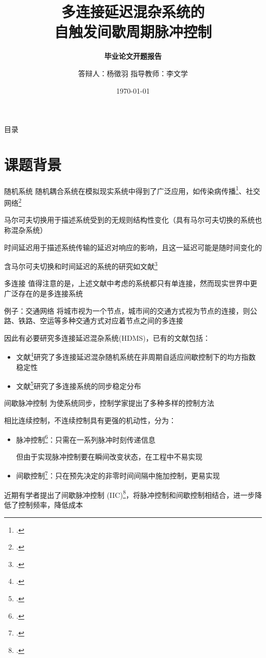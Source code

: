 \documentclass[10pt,aspectratio=43]{beamer}
\title{多连接延迟混杂系统的\\自触发间歇周期脉冲控制}
\subtitle{\fontsize{9pt}{14pt}\textbf{毕业论文开题报告}}
\author{答辩人：杨徵羽 \quad 指导教师：李文学}
\institute{哈尔滨工业大学(威海)理学院}
\date{\today}
\begin{document}
\frame{\titlepage}

\section[目录]{}   %
\begin{frame}{目录}
\tableofcontents
\end{frame}

\section{课题背景}
\begin{frame}{随机系统}
\alert{随机耦合系统}在模拟现实系统中得到了广泛应用，如传染病传播\footcite{2012modelling}、社交网络\footcite{1999small}

\alert{马尔可夫切换}用于描述系统受到的无规则结构性变化（具有马尔可夫切换的系统也称混杂系统）

\alert{时间延迟}用于描述系统传输的延迟对响应的影响，且这一延迟可能是随时间变化的

含马尔可夫切换和时间延迟的系统的研究如文献\footcite{2015global, 2018stabilization}
\end{frame}

\begin{frame}{多连接}
值得注意的是，上述文献中考虑的系统都只有单连接，然而现实世界中更广泛存在的是\alert{多连接系统}
\begin{block}{例子：交通网络}
将城市视为一个节点，城市间的交通方式视为节点的连接，则公路、铁路、空运等多种交通方式对应着节点之间的多连接
\end{block}
因此有必要研究多连接延迟混杂系统(HDMS)，已有的文献包括：
\begin{itemize}
\item 文献\footcite{2020stochastic}研究了多连接延迟混杂随机系统在非周期自适应间歇控制下的均方指数稳定性
\item 文献\footcite{2020synchronization}研究了多连接系统的同步稳定分布
\end{itemize}
\end{frame}

\begin{frame}{间歇脉冲控制}
为使系统同步，控制学家提出了多种多样的控制方法

相比连续控制，\alert{不连续控制}具有更强的机动性，分为：
\begin{itemize}
\item \alert{脉冲控制}\footcite{2019review}：只需在一系列脉冲时刻传递信息

但由于实现脉冲控制要在瞬间改变状态，在工程中不易实现
\item \alert{间歇控制}\footcite{2021improved}：只在预先决定的非零时间间隔中施加控制，更易实现
\end{itemize}

近期有学者提出了\alert{间歇脉冲控制} (IIC)\footcite{2013intermittent, 2016intermittent}，将脉冲控制和间歇控制相结合，进一步降低了控制频率，降低成本
\end{frame}
\end{document}
